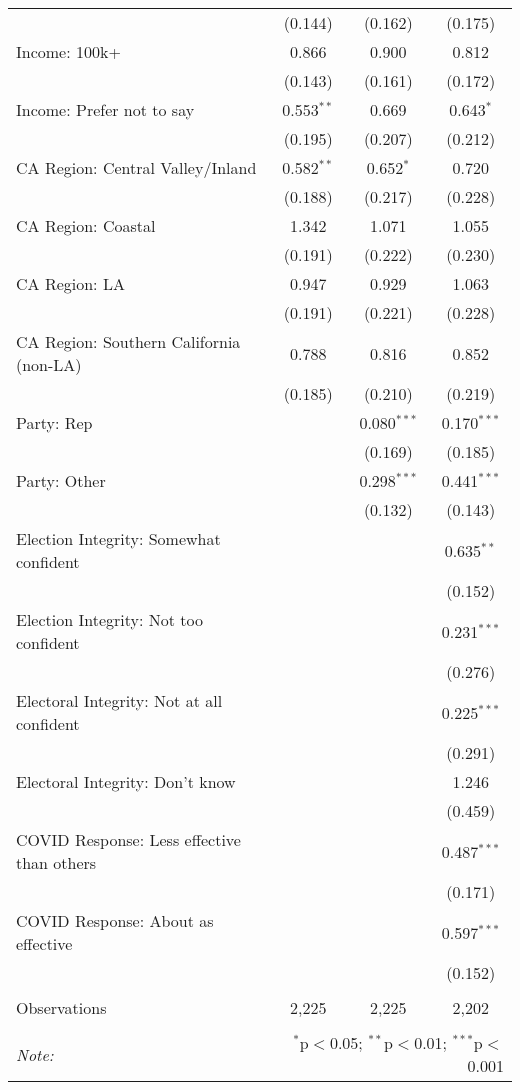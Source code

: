 \begin{table}[!htbp]
\begin{tabular}{@{\extracolsep{5pt}}lccc}
  & (0.144) & (0.162) & (0.175) \\ 
  Income: 100k+ & 0.866 & 0.900 & 0.812 \\ 
  & (0.143) & (0.161) & (0.172) \\ 
  Income: Prefer not to say & 0.553$^{**}$ & 0.669 & 0.643$^{*}$ \\ 
  & (0.195) & (0.207) & (0.212) \\ 
  CA Region: Central Valley/Inland & 0.582$^{**}$ & 0.652$^{*}$ & 0.720 \\ 
  & (0.188) & (0.217) & (0.228) \\ 
  CA Region: Coastal & 1.342 & 1.071 & 1.055 \\ 
  & (0.191) & (0.222) & (0.230) \\ 
  CA Region: LA & 0.947 & 0.929 & 1.063 \\ 
  & (0.191) & (0.221) & (0.228) \\ 
  CA Region: Southern California (non-LA) & 0.788 & 0.816 & 0.852 \\ 
  & (0.185) & (0.210) & (0.219) \\ 
  Party: Rep &  & 0.080$^{***}$ & 0.170$^{***}$ \\ 
  &  & (0.169) & (0.185) \\ 
  Party: Other &  & 0.298$^{***}$ & 0.441$^{***}$ \\ 
  &  & (0.132) & (0.143) \\ 
  Election Integrity: Somewhat confident &  &  & 0.635$^{**}$ \\ 
  &  &  & (0.152) \\ 
  Election Integrity: Not too confident &  &  & 0.231$^{***}$ \\ 
  &  &  & (0.276) \\ 
  Electoral Integrity: Not at all confident &  &  & 0.225$^{***}$ \\ 
  &  &  & (0.291) \\ 
  Electoral Integrity: Don't know &  &  & 1.246 \\ 
  &  &  & (0.459) \\ 
  COVID Response: Less effective than others &  &  & 0.487$^{***}$ \\ 
  &  &  & (0.171) \\ 
  COVID Response: About as effective &  &  & 0.597$^{***}$ \\ 
  &  &  & (0.152) \\ 
 \hline \\[-1.8ex] 
Observations & 2,225 & 2,225 & 2,202 \\ 
\hline 
\hline \\[-1.8ex] 
\textit{Note:}  & \multicolumn{3}{r}{$^{*}$p$<$0.05; $^{**}$p$<$0.01; $^{***}$p$<$0.001} \\ 
\end{tabular} 
\end{table} 

